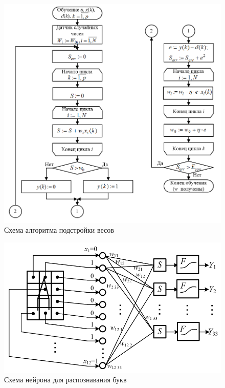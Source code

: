 \documentclass{beamer}
\begin{document}
\begin{frame}[t]
	\begin{figure}[h]
		\centering
		\includegraphics[scale=0.35]{images/lec03-alg.png}
		\caption{Схема алгоритма подстройки весов}
	\end{figure}
\end{frame}

\begin{frame}[t]
	\begin{figure}[h]
		\centering
		\includegraphics[scale=0.5]{images/lec03-letters.png}
		\caption{Схема нейрона для распознавания букв}
	\end{figure}
\end{frame}
\end{document}
